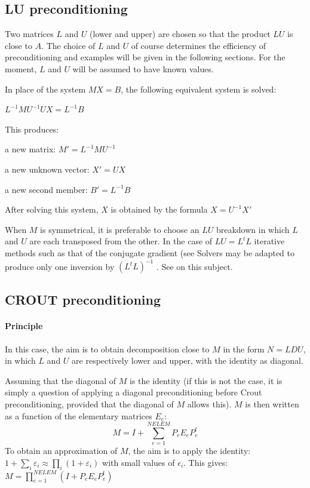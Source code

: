 \subsection{LU preconditioning}

Two matrices $L$ and $U$ (lower and upper) are chosen so that the product $LU$ is
close to $A$. The choice of $L$ and $U$ of course determines the efficiency of
preconditioning and examples will be given in the following sections. For the
moment, $L$ and $U$ will be assumed to have known values.

In place of the system $M X = B$, the following equivalent system is solved:

$L^{-1} M U^{-1} U X  =  L^{-1} B$

This produces:

a new matrix: $M' = L^{-1} M U^{-1}$

a new unknown vector: $X' = U X$

a new second member: $B' = L^{-1} B$


After solving this system, $X$ is obtained by the formula $X = U^{-1} X'$

When $M$ is symmetrical, it is preferable to choose an $LU$ breakdown in which
$L$ and $U$ are each transposed from the other. In the case of $LU = L^{t}L$
iterative methods such as that of the conjugate gradient (see
Solvers may be adapted to produce only one inversion by
$(L^{t}L)^{-1}$ . See \cite{Hervouet1991} on this subject.

\subsection{CROUT preconditioning}

\paragraph{Principle}

In this case, the aim is to obtain decomposition close to $M$ in the form $N
= LDU$, in which $L$ and $U$ are respectively lower and upper, with the
identity as diagonal.

Assuming that the diagonal of $M$ is the identity (if this is not the case, it is
simply a question of applying a diagonal preconditioning before Crout
preconditioning, provided that the diagonal of $M$ allows this). $M$ is then
written as a function of the elementary matrices $E_{e}$:
\[M=I+\sum _{e=1}^{NELEM}P_{e} E_{e} P_{e}^{t}  \]
To obtain an approximation of $M$, the aim is to apply the identity:
$1+\sum _{i}\varepsilon _{i}  \approx \prod _{i}(1+\varepsilon _{i} ) $ with
small values of $\epsilon _{i}$. This gives: $M=\prod _{e=1}^{NELEM}(I+P_{e} E_{e} P_{e}^{t}
) $

